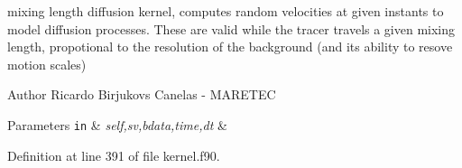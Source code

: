 mixing length diffusion kernel, computes random velocities at given instants to model diffusion processes. These are valid while the tracer travels a given mixing length, propotional to the resolution of the background (and its ability to resove motion scales) 

\begin{DoxyAuthor}{Author}
Ricardo Birjukovs Canelas -\/ M\+A\+R\+E\+T\+EC 
\end{DoxyAuthor}

\begin{DoxyParams}[1]{Parameters}
\mbox{\tt in}  & {\em self,sv,bdata,time,dt} & \\
\hline
\end{DoxyParams}


Definition at line 391 of file kernel.\+f90.


